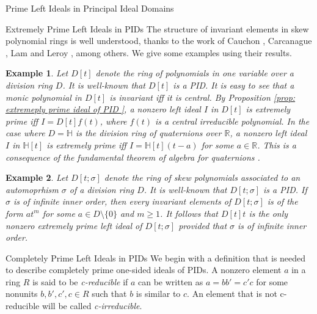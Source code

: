 \documentclass[11pt,a4paper]{article}
\theoremstyle{theorem}
\newtheorem{example}{Example}[section]
\numberwithin{equation}{section}
\begin{document}
\begin{section}{Prime Left Ideals in Principal Ideal Domains}
\begin{subsection}{Extremely Prime Left Ideals in PIDs}
	The structure of invariant elements in skew polynomial rings is well understood, thanks to the work of Cauchon \cite{cauchon2006ideaux}, Carcanague \cite{carcanague1971ideaux}, Lam and Leroy \cite{lam1988algebraic}, among others. We give some examples using their results.  
	\begin{example}
		Let \(D[t]\) denote the ring of polynomials in one variable over a division ring \(D\). It is well-known that \(D[t]\) is a PID. It is easy to see that a monic polynomial in \(D[t]\) is invariant iff it is central. By Proposition \ref{prop: extremeply prime ideal of PID }, a nonzero left ideal \(I\) in \(D[t]\) is extremely prime iff \(I=D[t]f(t)\), where \(f(t)\) is a central irreducible polynomial. In the case where \(D = \mathbb{H}\) is the division ring of quaternions over \(\mathbb{R}\), a nonzero left ideal \(I\) in \(\mathbb{H}[t]\)  is extremely prime iff \(I=\mathbb{H}[t](t-a)\) for some \(a\in\mathbb{R}\). This is a consequence of the fundamental theorem of algebra for quaternions \cite[Thoerem 16.14]{lam2001afirst}. 
	\end{example}
	
	\begin{example}
		Let \(D[t;\sigma]\) denote the ring of skew polynomials associated to an automoprhism \(\sigma\) of a division ring \(D\). It is well-known that \(D[t;\sigma]\) is a PID. If \(\sigma\) is of infinite inner order, then every  invariant elements of \(D[t;\sigma]\) is of the form \(at^m\) for some \(a\in D\setminus \{0\}\) and \(m\geq 1\). It follows that \(D[t]t\) is
		the only nonzero extremely prime left ideal of \(D[t;\sigma]\) provided that \(\sigma\) is of infinite inner order.  
	\end{example}
	
	\end{subsection}
	\begin{subsection}{Completely Prime Left Ideals in PIDs }
		We begin with a definition that is needed to describe completely prime one-sided ideals of PIDs. A nonzero element \(a\) in a ring \(R\) is said to be \textit{c-reducible} if \(a\) can be written  as \(a = bb' = c'c\) for some nonunits \(b,b',c',c\in R\) such that \(b\) is similar to \(c\). An element that is not c-reducible will be called \textit{c-irreducible}. 
		

\end{subsection}
\end{section}
\end{document}
